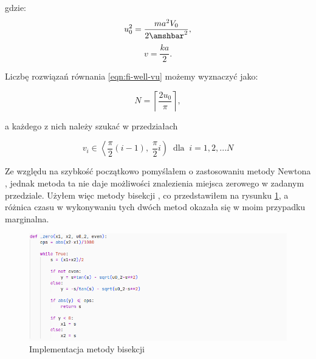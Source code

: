\documentclass{SGGW-thesis}
\begin{document}
gdzie:
	\[u_0^2=\frac{ma^2V_0}{2\amshbar^2},\]
	\[v=\frac{ka}{2}.\]
		
Liczbę rozwiązań równania \ref{eqn:fi-well-vu} możemy wyznaczyć jako:

	\begin{equation}
	N = \left \lceil \frac{2u_0}{\pi} \right \rceil,
	\end{equation}
	
a każdego z nich należy szukać w przedziałach

	\begin{equation}\label{v-range}
	v_i \in \left< \frac{\pi}{2}(i-1), \; \frac{\pi}{2}i \right) \;\; \textrm{dla} \; \; i = 1, 2, ... N
	\end{equation}
	
	Ze względu na szybkość początkowo pomyślałem o zastosowaniu metody Newtona \cite{newton-method}, jednak metoda ta nie daje możliwości znalezienia miejsca zerowego w zadanym przedziale. Użyłem więc metody bisekcji \cite{bisection-method}, co przedstawiłem na rysunku \ref{fig:bisection}, a różnica czasu w wykonywaniu tych dwóch metod okazała się w moim przypadku marginalna.
		
	\begin{figure}[h]
		\includegraphics[width=\textwidth,height=\textheight,keepaspectratio]{bisection.png}
		\caption{Implementacja metody bisekcji}
		\label{fig:bisection}
	\end{figure}
\end{document}
